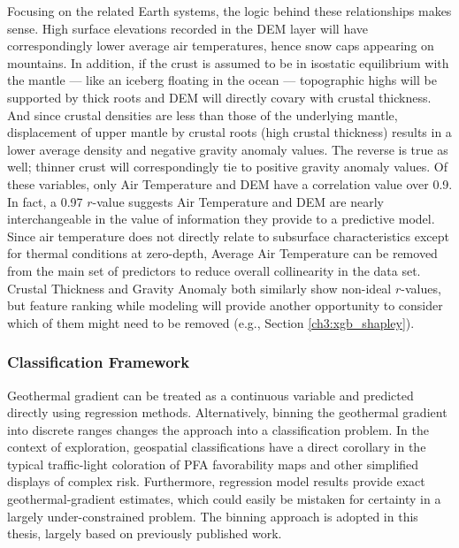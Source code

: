 Focusing on the related Earth systems, the logic behind these relationships makes sense. High surface elevations recorded in the DEM layer will have correspondingly lower average air temperatures, hence snow caps appearing on mountains. In addition, if the crust is assumed to be in isostatic equilibrium with the mantle --- like an iceberg floating in the ocean --- topographic highs will be supported by thick roots and DEM will directly covary with crustal thickness. And since crustal densities are less than those of the underlying mantle, displacement of upper mantle by crustal roots (high crustal thickness) results in a lower average density and negative gravity anomaly values. The reverse is true as well; thinner crust will correspondingly tie to positive gravity anomaly values.  
Of these variables, only Air Temperature and DEM have a correlation value over 0.9. In fact, a 0.97 $r$-value suggests Air Temperature and DEM are nearly interchangeable in the value of information they provide to a predictive model. Since air temperature does not directly relate to subsurface characteristics except for thermal conditions at zero-depth, Average Air Temperature can be removed from the main set of predictors to reduce overall collinearity in the data set. Crustal Thickness and Gravity Anomaly both similarly show non-ideal $r$-values, but feature ranking while modeling will provide another opportunity to consider which of them might need to be removed (e.g., Section \ref{ch3:xgb_shapley}).

\subsubsection{Classification Framework}\label{ch3:gradient_classes}

Geothermal gradient can be treated as a continuous variable and predicted directly using regression methods. Alternatively, binning the geothermal gradient into discrete ranges changes the approach into a classification problem. In the context of exploration, geospatial classifications have a direct corollary in the typical traffic-light coloration of PFA favorability maps and other simplified displays of complex risk. Furthermore, regression model results provide exact geothermal-gradient estimates, which could easily be mistaken for certainty in a largely under-constrained problem. The binning approach is adopted in this thesis, largely based on previously published work.

